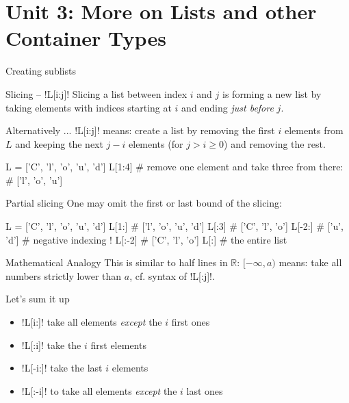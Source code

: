\documentclass[hyperref={pdfpagelabels=false},table,handout]{beamer}
\begin{document}
\part{Unit 3: More on Lists and other Container Types}


\begin{frame}[fragile]{Creating sublists}
\begin{block}{Slicing -- \pyth!L[i:j]!}
\alert{Slicing} a list between index $i$ and $j$ is forming a new list by taking
elements with indices starting at $i$ and ending \emph{just before} $j$.
\end{block}

\begin{block}{Alternatively ...}
\pyth!L[i:j]! means: create a list by removing the first
$i$ elements from $L$  and keeping the next $j-i$ elements (for $j > i \ge 0 $)
and removing the rest.
\end{block}
\vfill
\begin{example}
\begin{python}
L = ['C', 'l', 'o', 'u', 'd']
L[1:4] # remove one element and take three from there:
# ['l', 'o', 'u']
\end{python}
\end{example}
\end{frame}

\begin{frame}[fragile]{Partial slicing}
One may omit the first or last bound of the slicing:
\begin{python}
L = ['C', 'l', 'o', 'u', 'd']
L[1:] # ['l', 'o', 'u', 'd']
L[:3] # ['C', 'l', 'o']
L[-2:] # ['u', 'd']    # negative indexing !
L[:-2] # ['C', 'l', 'o']
L[:] # the entire list
\end{python}
\vfill
\begin{block}{Mathematical Analogy}
This is similar to half lines in $\mathbb{R}$:
$[-\infty,a)$ means: take all numbers strictly lower than $a$,
cf.  syntax of  \pyth!L[:j]!.
\end{block}
Let's sum it up
\begin{itemize}
\item \pyth!L[i:]! take all elements \emph{except} the $i$ first ones
\item \pyth!L[:i]!  take the $i$ first elements
\item \pyth!L[-i:]!  take the last $i$ elements
\item \pyth!L[:-i]! to take all elements \emph{except} the $i$ last ones
\end{itemize}
\end{frame}
\end{document}

